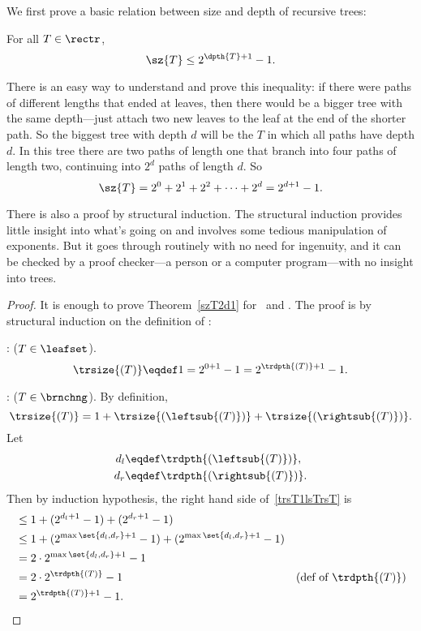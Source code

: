 \begin{definition}
We first prove a basic relation between size and depth of recursive
trees:
\begin{theorem}\label{szT2d1}
For all $T \in \rectr$,
\begin{equation}\label{sT2d+1}
\sz{T} \leq 2^{\dpth{T}+1} - 1.
\end{equation}
\end{theorem}

There is an easy way to understand and prove this inequality: if
there were paths of different lengths that ended at leaves, then there
would be a bigger tree with the same depth---just attach two new
leaves to the leaf at the end of the shorter path.  So the biggest
tree with depth $d$ will be the  $T$ in which all
paths have depth $d$.  In this tree there are two paths of length one
that branch into four paths of length two, continuing into $2^d$ paths
of length $d$.  So
\[
\sz{T} = 2^0 + 2^1 + 2^2 + \cdots + 2^d = 2^{d+1}-1.
\]

There is also a proof by structural induction.  The structural
induction provides little insight into what's going on and involves
some tedious manipulation of exponents.  But it goes through routinely
with no need for ingenuity, and it can be checked by a proof
checker---a person or a computer program---with no insight into trees.

\begin{proof} 
It is enough to prove Theorem~\ref{szT2d1} for \trsize\ and \trdpth.
The proof is by structural induction on the definition of \rectr:

: ($T \in \leafset$).
\[
\trsize{(T)} \eqdef 1 = 2^{0+1} - 1 = 2^{\trdpth{(T)}+1} - 1.
\]

: ($T \in \brnchng$).
By definition,
\begin{equation}\label{trsT1lsTrsT}
\trsize{(T)} = 1 + \trsize{(\leftsub{(T)})} + \trsize{(\rightsub{(T)})}.
\end{equation}
Let
\begin{align*}
d_l & \eqdef \trdpth{(\leftsub{(T)})},\\
d_r & \eqdef \trdpth{(\rightsub{(T)})}.
\end{align*}
Then by induction hypothesis, the right hand side of~\eqref{trsT1lsTrsT} is
\begin{align*}
& \leq 1 + (2^{d_l+1} -1)  + (2^{d_r+1} -1)\\
& \leq 1 + (2^{\max\set{d_l,d_r}+1} -1)  + (2^{\max\set{d_l,d_r}+1} -1)\\
& = 2\cdot 2^{\max\set{d_l,d_r}+1} - 1\\
& = 2\cdot 2^{\trdpth{(T)}} - 1
              & \text{(def of $\trdpth{(T)}$)}\\
& =  2^{\trdpth{(T)}+1} - 1.
\end{align*}
\end{proof}


\end{definition}
